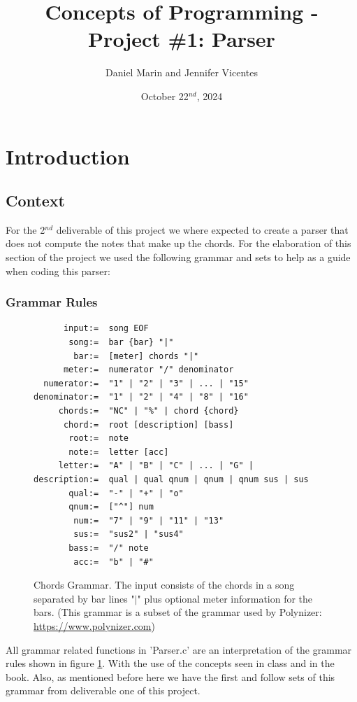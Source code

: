 \documentclass{article}
\title{Concepts of Programming - Project \#1: Parser}
\author{Daniel Marin and Jennifer Vicentes}
\date{October 22$^{nd}$, 2024}
\begin{document}
\maketitle
\tableofcontents
\newpage
\section{Introduction}
\subsection{Context}
For the 2$^{nd}$ deliverable of this project we where expected to create a parser that does not compute the notes that make up the chords. For the elaboration of this section of the project we used the following grammar and sets to help as a guide when coding this parser:
\subsubsection{Grammar Rules}
\begin{figure}[H]
    \centering
    \begin{lstlisting}
      input:=  song EOF
       song:=  bar {bar} "|"
        bar:=  [meter] chords "|"
      meter:=  numerator "/" denominator
  numerator:=  "1" | "2" | "3" | ... | "15"
denominator:=  "1" | "2" | "4" | "8" | "16"
     chords:=  "NC" | "%" | chord {chord}
      chord:=  root [description] [bass]
       root:=  note
       note:=  letter [acc]
     letter:=  "A" | "B" | "C" | ... | "G" |
description:=  qual | qual qnum | qnum | qnum sus | sus
       qual:=  "-" | "+" | "o"
       qnum:=  ["^"] num
        num:=  "7" | "9" | "11" | "13"
        sus:=  "sus2" | "sus4"
       bass:=  "/" note
        acc:=  "b" | "#"
    \end{lstlisting}
    \caption{Chords Grammar. The input consists of the chords in a song separated by bar lines "$|$" plus optional meter information for the bars. (This grammar is a subset of the grammar used by Polynizer: \url{https://www.polynizer.com})}
    \label{fig:Grammar}
\end{figure} 
All grammar related functions in 'Parser.c' are an interpretation of the grammar rules shown in figure \ref*{fig:Grammar}. With the use of the concepts seen in class and in the book. Also, as mentioned before here we have the first and follow sets of this grammar from deliverable one of this project.
\end{document}
